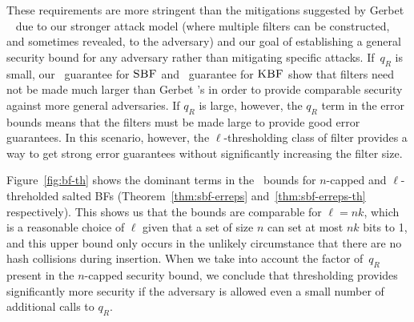 These requirements are more stringent than the mitigations suggested by Gerbet
\etal~\cite{gerbet2015power} due to our stronger attack model (where multiple
filters can be constructed, and sometimes revealed, to the adversary) and our
goal of establishing a general security bound for any adversary rather than
mitigating specific attacks. If~$q_R$ is small, our \erreps\ guarantee for
$\textnormal{\textsc{SBF}}$ and \errep\ guarantee for $\textnormal{\textsc{KBF}}$ show that filters need not be made much
larger than Gerbet \etal's in order to provide comparable security against more
general adversaries. If $q_R$ is large, however, the $q_R$ term in the error
bounds means that the filters must be made large to provide good error
guarantees. In this scenario, however, the $\ell$-thresholding class of filter
provides a way to get strong error guarantees without significantly increasing
the filter size.

%
Figure~\ref{fig:bf-th} shows the dominant terms in the \erreps\ bounds for
$n$-capped and $\ell$-threholded salted BFs (Theorem~\ref{thm:sbf-erreps}
and~\ref{thm:sbf-erreps-th} respectively). This shows us that the bounds are
comparable for $\ell=nk$, which is a reasonable choice of $\ell$ given that a
set of size $n$ can set at most $nk$ bits to 1, and this upper bound only occurs
in the unlikely circumstance that there are no hash collisions during insertion.
When we take into account the factor of~$q_R$ present in the $n$-capped security
bound, we conclude that thresholding provides significantly more security if the
adversary is allowed even a small number of additional calls to $q_R$.

